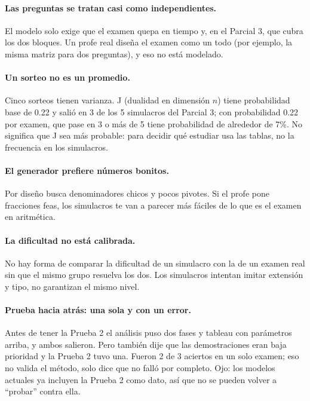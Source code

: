 \documentclass[11pt]{article}
\begin{document}
\paragraph{Las preguntas se tratan casi como independientes.} El modelo solo exige que el
examen quepa en tiempo y, en el Parcial 3, que cubra los dos bloques. Un profe real diseña el
examen como un todo (por ejemplo, la misma matriz para dos preguntas), y eso no está modelado.

\paragraph{Un sorteo no es un promedio.} Cinco sorteos tienen varianza. J (dualidad en
dimensión $n$) tiene probabilidad base de 0.22 y salió en 3 de los 5 simulacros del Parcial 3;
con probabilidad 0.22 por examen, que pase en 3 o más de 5 tiene probabilidad de alrededor de
7\%. No significa que J sea más probable: para decidir qué estudiar usa las tablas, no la
frecuencia en los simulacros.

\paragraph{El generador prefiere números bonitos.} Por diseño busca denominadores chicos y
pocos pivotes. Si el profe pone fracciones feas, los simulacros te van a parecer más fáciles
de lo que es el examen en aritmética.

\paragraph{La dificultad no está calibrada.} No hay forma de comparar la dificultad de un
simulacro con la de un examen real sin que el mismo grupo resuelva los dos. Los simulacros
intentan imitar extensión y tipo, no garantizan el mismo nivel.

\paragraph{Prueba hacia atrás: una sola y con un error.} Antes de tener la Prueba 2 el análisis
puso dos fases y tableau con parámetros arriba, y ambos salieron. Pero también dije que las
demostraciones eran baja prioridad y la Prueba 2 tuvo una. Fueron 2 de 3 aciertos en un solo
examen; eso no valida el método, solo dice que no falló por completo. Ojo: los modelos actuales
ya incluyen la Prueba 2 como dato, así que no se pueden volver a ``probar'' contra ella.
\end{document}
